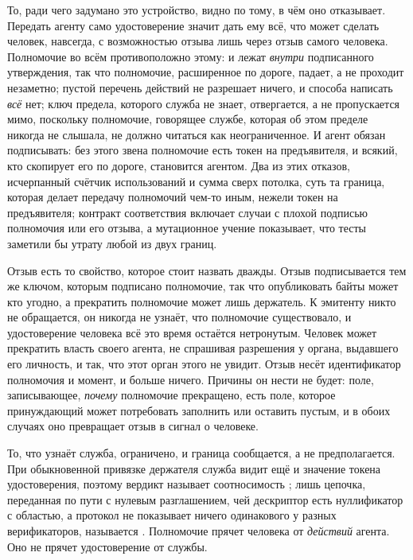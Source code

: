 То, ради чего задумано это устройство, видно по тому, в чём оно отказывает. Передать агенту само
удостоверение значит дать ему всё, что может сделать человек, навсегда, с возможностью отзыва
лишь через отзыв самого человека. Полномочие во всём противоположно этому:  и
 лежат \emph{внутри} подписанного утверждения, так что полномочие, расширенное по
дороге, падает, а не проходит незаметно; пустой перечень действий не разрешает ничего, и способа
написать \emph{всё} нет; ключ предела, которого служба не знает, отвергается, а не пропускается
мимо, поскольку полномочие, говорящее  службе, которая об этом пределе
никогда не слышала, не должно читаться как неограниченное. И агент обязан подписывать: без этого
звена полномочие есть токен на предъявителя, и всякий, кто скопирует его по дороге, становится
агентом. Два из этих отказов, исчерпанный счётчик использований и сумма сверх потолка, суть та
граница, которая делает передачу полномочий чем-то иным, нежели токен на предъявителя; контракт
соответствия включает случаи с плохой подписью полномочия или его отзыва, а мутационное учение
показывает, что тесты заметили бы утрату любой из двух границ. \sImpl

Отзыв есть то свойство, которое стоит назвать дважды. Отзыв подписывается тем же ключом, которым
подписано полномочие, так что опубликовать байты может кто угодно, а прекратить полномочие может
лишь держатель. К эмитенту никто не обращается, он никогда не узнаёт, что полномочие существовало,
и удостоверение человека всё это время остаётся нетронутым. Человек может прекратить власть своего
агента, не спрашивая разрешения у органа, выдавшего его личность, и так, что этот орган этого не
увидит. Отзыв несёт идентификатор полномочия и момент, и больше ничего. Причины он нести не будет:
поле, записывающее, \emph{почему} полномочие прекращено, есть поле, которое принуждающий может
потребовать заполнить или оставить пустым, и в обоих случаях оно превращает отзыв в сигнал о
человеке.

То, что узнаёт служба, ограничено, и граница сообщается, а не предполагается. При обыкновенной
привязке держателя служба видит ещё и значение токена удостоверения, поэтому вердикт называет
соотносимость ; лишь цепочка, переданная по пути с нулевым разглашением, чей
дескриптор есть нуллификатор с областью, а протокол не показывает ничего одинакового у разных
верификаторов, называется . Полномочие прячет человека от \emph{действий} агента.
Оно не прячет удостоверение от службы.

